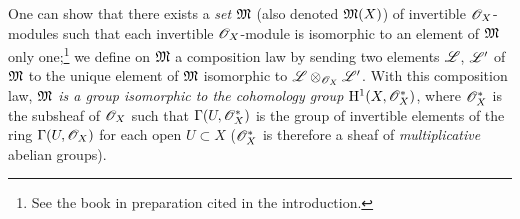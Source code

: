 \begin{env}[5.4.7]
\label{0.5.4.7}
One can show that there exists a {\em set} $\mathfrak{M}$ (also denoted
$\mathfrak{M}(X)$) of invertible $\mathscr{O}_X$-modules such that each invertible
$\mathscr{O}_X$-module is isomorphic to an element of $\mathfrak{M}$ only
one;\footnote{See the book in preparation cited in the introduction.} we define
on $\mathfrak{M}$ a composition law by sending two elements $\mathscr{L}$, $\mathscr{L}'$
of $\mathfrak{M}$ to the unique element of $\mathfrak{M}$ isomorphic to
$\mathscr{L}\otimes_{\mathscr{O}_X}\mathscr{L}'$. With this composition law, {\em $\mathfrak{M}$
is a group isomorphic to the cohomology group $\mathrm{H}^1(X,\mathscr{O}_X^*)$}, where
$\mathscr{O}_X^*$ is the subsheaf of $\mathscr{O}_X$ such that $\Gamma(U,\mathscr{O}_X^*)$ is the group
of invertible elements of the ring $\Gamma(U,\mathscr{O}_X)$ for each open $U\subset X$
($\mathscr{O}_X^*$ is therefore a sheaf of {\em multiplicative} abelian groups).


\end{env}
